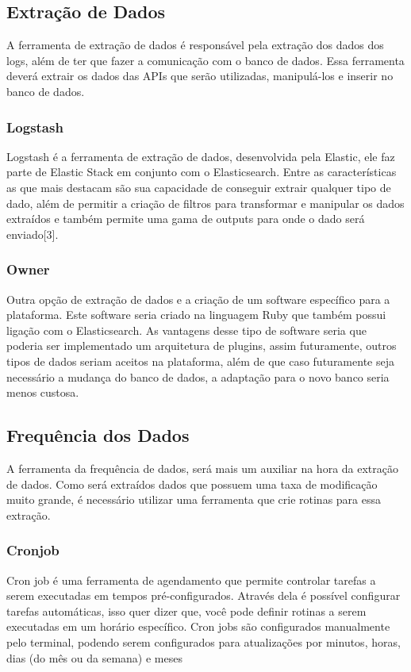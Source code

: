 	\subsection*{Extração de Dados}
	A ferramenta de extração de dados é responsável pela extração dos dados dos logs, além de ter que fazer a comunicação com o banco de dados. Essa ferramenta deverá extrair os dados das APIs que serão utilizadas, manipulá-los e inserir no banco de dados.
		\subsubsection*{Logstash}
		Logstash é a ferramenta de extração de dados, desenvolvida pela Elastic, ele faz parte de Elastic Stack em conjunto com o Elasticsearch. Entre as características as que mais destacam são sua capacidade de conseguir extrair qualquer tipo de dado, além de permitir a criação de filtros para transformar e manipular os dados extraídos e também permite uma gama de outputs para onde o dado será enviado[3].
		\subsubsection*{Owner}
		Outra opção de extração de dados e a criação de um software específico para a plataforma. Este software seria criado na linguagem Ruby que também possui ligação com o Elasticsearch. As vantagens desse tipo de software seria que poderia ser implementado um arquitetura de plugins, assim futuramente, outros tipos de dados seriam aceitos na plataforma, além de que caso futuramente seja necessário a mudança do banco de dados, a adaptação para o novo banco seria menos custosa.
	\subsection*{Frequência dos Dados}
	A ferramenta da frequência de dados, será mais um auxiliar na hora da extração de dados. Como será extraídos dados que possuem uma taxa de modificação muito grande, é necessário utilizar uma ferramenta que crie rotinas para essa extração.
		\subsubsection*{Cronjob}
		Cron job é uma ferramenta de agendamento que permite controlar tarefas a serem executadas em tempos pré-configurados. Através dela é possível configurar tarefas automáticas, isso quer dizer que, você pode definir rotinas a serem executadas em um horário específico. Cron jobs são configurados manualmente pelo terminal, podendo serem configurados para atualizações por minutos, horas, dias (do mês ou da semana) e meses
